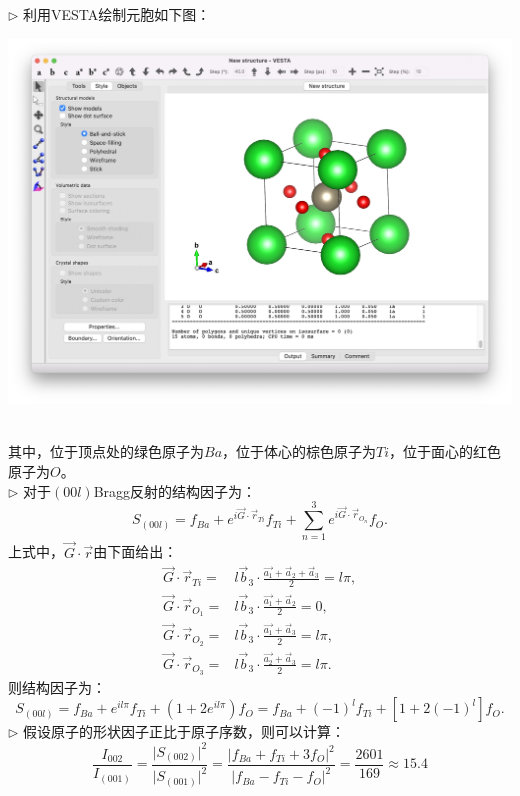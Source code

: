 \documentclass[reqno,a4paper,12pt]{amsart}
\begin{document}
\begin{enumerate}[1.]
\begin{tcolorbox}[breakable, colback = black!5!white, colframe = black]
$\triangleright$ 利用VESTA绘制元胞如下图： \\
\begin{centering}
	\includegraphics[scale = 0.15]{14.2.jpeg}
\end{centering}\\
其中，位于顶点处的绿色原子为$Ba$，位于体心的棕色原子为$Ti$，位于面心的红色原子为$O$。 \\
$\triangleright$ 对于$(00l)$Bragg反射的结构因子为：
\[
	S_{(00l)} = f_{Ba} + e^{i\vec{G}\cdot\vec{r}_{Ti}} f_{Ti} + \sum_{n=1}^3 e^{i\vec{G} \cdot \vec{r}_{O_n}} f_O.
\]
上式中，$\vec{G}\cdot\vec{r}$由下面给出： 
\begin{align*}
	\vec{G}\cdot\vec{r}_{Ti} =& l\vec{b}_3 \cdot \frac{\vec{a_1} + \vec{a}_2 + \vec{a}_3}{2} = l \pi, \\
	\vec{G}\cdot\vec{r}_{O_1} =& l\vec{b}_3 \cdot \frac{\vec{a_1} + \vec{a}_2}{2} = 0, \\
	\vec{G}\cdot\vec{r}_{O_2} =& l\vec{b}_3 \cdot \frac{\vec{a_1} + \vec{a}_3}{2} = l \pi, \\
	\vec{G}\cdot\vec{r}_{O_3} =& l\vec{b}_3 \cdot \frac{\vec{a_2} + \vec{a}_3}{2} = l \pi.
\end{align*}
则结构因子为：
\[
	S_{(00l)} = f_{Ba} + e^{il\pi} f_{Ti} + (1+2e^{il\pi})f_O = f_{Ba} + (-1)^l f_{Ti} + \left[ 1+2(-1)^l \right]f_O.
\]
$\triangleright$ 假设原子的形状因子正比于原子序数，则可以计算：
\[
	\frac{I_{002}}{I_{(001)}} = \frac{\vert S_{(002)} \vert^2}{\vert S_{(001)} \vert^2} = \frac{\vert f_{Ba} + f_{Ti} +3f_O \vert^2}{\vert f_{Ba} - f_{Ti} - f_{O} \vert^2} = \frac{2601}{169} \approx 15.4
\]
\end{tcolorbox}


\end{enumerate}
\end{document}
